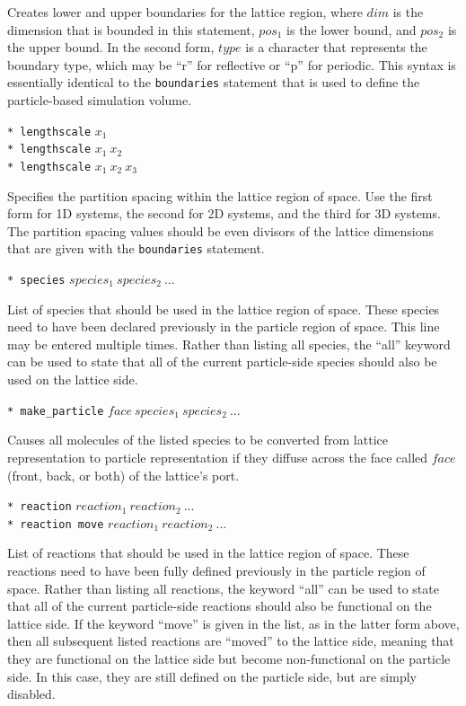 \documentclass {scrbook}
\newcommand {\ttt} {\texttt}
\begin{document}
\begin{description}
Creates lower and upper boundaries for the lattice region, where $dim$ is the dimension that is bounded in this statement, $pos_1$ is the lower bound, and $pos_2$ is the upper bound. In the second form, $type$ is a character that represents the boundary type, which may be ``r'' for reflective or ``p'' for periodic. This syntax is essentially identical to the \ttt{boundaries} statement that is used to define the particle-based simulation volume.

\item{\ttt{* lengthscale} $x_1$\\
\ttt{* lengthscale} $x_1\ x_2$\\
\ttt{* lengthscale} $x_1\ x_2\ x_3$}

Specifies the partition spacing within the lattice region of space. Use the first form for 1D systems, the second for 2D systems, and the third for 3D systems. The partition spacing values should be even divisors of the lattice dimensions that are given with the \ttt{boundaries} statement.

\item{\ttt{* species} $species_1\ species_2\ ...$}

List of species that should be used in the lattice region of space. These species need to have been declared previously in the particle region of space. This line may be entered multiple times. Rather than listing all species, the ``all'' keyword can be used to state that all of the current particle-side species should also be used on the lattice side.

\item{\ttt{* make\_particle} $face\ species_1\ species_2\ ...$}

Causes all molecules of the listed species to be converted from lattice representation to particle representation if they diffuse across the face called $face$ (front, back, or both) of the lattice's port.

\item{\ttt{* reaction} $reaction_1\ reaction_2\ ...$\\
\ttt{* reaction move} $reaction_1\ reaction_2\ ...$}

List of reactions that should be used in the lattice region of space. These reactions need to have been fully defined previously in the particle region of space. Rather than listing all reactions, the keyword ``all'' can be used to state that all of the current particle-side reactions should also be functional on the lattice side. If the keyword ``move'' is given in the list, as in the latter form above, then all subsequent listed reactions are ``moved'' to the lattice side, meaning that they are functional on the lattice side but become non-functional on the particle side. In this case, they are still defined on the particle side, but are simply disabled.


\end{description}
\end{document}
